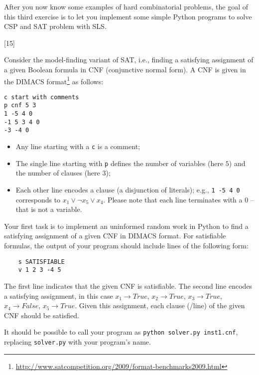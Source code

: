 \documentclass{exam}
\begin{document}
After you now know some examples of hard combinatorial problems, the goal of this third exercise is to let you implement some simple Python programs to solve CSP and SAT problem with SLS.


\begin{questions}


	[15]
	
	Consider the model-finding variant of SAT, i.e., finding a satisfying assignment of a given Boolean formula in CNF (conjunctive normal form).
	A CNF is given in the DIMACS format\footnote{\url{http://www.satcompetition.org/2009/format-benchmarks2009.html}} as follows:

\begin{verbatim}
c start with comments
p cnf 5 3
1 -5 4 0
-1 5 3 4 0
-3 -4 0
\end{verbatim}

\begin{itemize}
  \item Any line starting with a \texttt{c} is a comment;
  \item The single line starting with \texttt{p} defines the number of variables (here $5$) and the number of clauses (here $3$);
  \item Each other line encodes a clause (a disjunction of literals); e.g., \texttt{1 -5 4 0} corresponds to $x_1 \vee \neg x_5 \vee x_4$. Please note that each line terminates with a $0$ -- that is not a variable.
\end{itemize}	
		 
	Your first task is to implement an uninformed random work in Python to find a satisfying assignment of a given CNF in DIMACS format.
	For satisfiable formulas, the output of your program should include lines of the following form:
	
	\begin{verbatim}
	s SATISFIABLE
	v 1 2 3 -4 5
	\end{verbatim}
	
	The first line indicates that the given CNF is satisfiable.
	The second line encodes a satisfying assignment, in this case $x_1 \to True$, $x_2 \to True$, $x_3 \to True$, $x_4 \to False$, $x_5 \to True$. Given this assignment, each clause (/line) of the given CNF should be satisfied.
	
	It should be possible to call your program as \texttt{python solver.py inst1.cnf}, replacing \texttt{solver.py} with your program's name.


\end{questions}
\end{document}
